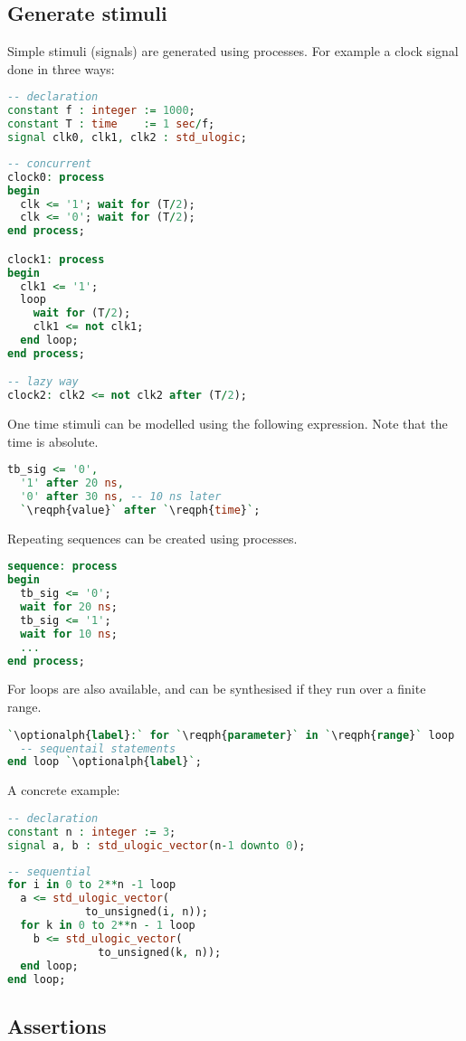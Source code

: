 \subsection{Generate stimuli}
Simple stimuli (signals) are generated using processes. For example a clock
signal done in three ways:
\begin{lstlisting}[language=vhdl]
-- declaration
constant f : integer := 1000;
constant T : time    := 1 sec/f;
signal clk0, clk1, clk2 : std_ulogic;
\end{lstlisting}
\begin{lstlisting}[language=vhdl]
-- concurrent
clock0: process
begin
  clk <= '1'; wait for (T/2);
  clk <= '0'; wait for (T/2);
end process;

clock1: process
begin
  clk1 <= '1';
  loop
    wait for (T/2);
    clk1 <= not clk1;
  end loop;
end process;

-- lazy way
clock2: clk2 <= not clk2 after (T/2);
\end{lstlisting}
One time stimuli can be modelled using the following expression. Note that the
time is absolute.
\begin{lstlisting}[language=vhdl]
tb_sig <= '0',
  '1' after 20 ns,
  '0' after 30 ns, -- 10 ns later
  `\reqph{value}` after `\reqph{time}`;
\end{lstlisting}
Repeating sequences can be created using processes.
\begin{lstlisting}[language=vhdl]
sequence: process
begin
  tb_sig <= '0';
  wait for 20 ns;
  tb_sig <= '1';
  wait for 10 ns;
  ...
end process;
\end{lstlisting}
For loops are also available, and can be synthesised if they run over a finite
range.
\begin{lstlisting}[language=vhdl]
`\optionalph{label}:` for `\reqph{parameter}` in `\reqph{range}` loop
  -- sequentail statements
end loop `\optionalph{label}`;
\end{lstlisting}
A concrete example:
\begin{lstlisting}[language=vhdl]
-- declaration
constant n : integer := 3;
signal a, b : std_ulogic_vector(n-1 downto 0);
\end{lstlisting}
\begin{lstlisting}[language=vhdl]
-- sequential
for i in 0 to 2**n -1 loop
  a <= std_ulogic_vector(
            to_unsigned(i, n));
  for k in 0 to 2**n - 1 loop
    b <= std_ulogic_vector(
              to_unsigned(k, n));
  end loop;
end loop;
\end{lstlisting}

\subsection{Assertions}
